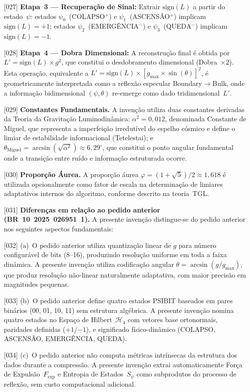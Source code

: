\documentclass[12pt,a4paper]{article}
\newcommand{\alphaii}{\alpha^2}
\newcommand{\thetaM}{\theta_{\text{Miguel}}}
\newcommand{\Fexp}{F_{\text{exp}}}
\newcommand{\Hfour}{\mathcal{H}_4}
\begin{document}
{[027]} \textbf{Etapa~3 --- Recuperação de Sinal:} Extrair
$\text{sign}(L)$ a partir do estado~$\psi$: estados
$\psi_0$~(COLAPSO$^+$) e $\psi_1$~(ASCENSÃO$^+$) implicam
$\text{sign}(L) = +1$; estados $\psi_2$~(EMERGÊNCIA$^-$) e
$\psi_3$~(QUEDA$^-$) implicam $\text{sign}(L) = -1$.

{[028]} \textbf{Etapa~4 --- Dobra Dimensional:} A reconstrução
final é obtida por $L' = \text{sign}(L) \times g^2$, que
constitui o desdobramento dimensional (Dobra~$\times 2$). Esta
operação, equivalente a
$L' = \text{sign}(L) \times [g_{\max} \times \sin(\theta)]^2$,
é geometricamente interpretada como a reflexão especular
Boundary$\to$Bulk, onde a informação bidimensional
$(\psi, \theta)$ re-emerge como dado tridimensional~$L'$.

{[029]} \textbf{Constantes Fundamentais.} A invenção utiliza
duas constantes derivadas da Teoria da Gravitação
Luminodinâmica: $\alphaii = 0{,}012$, denominada Constante de
Miguel, que representa a imperfeição irredutível do espelho
cósmico e define o limiar de estabilidade informacional
(Tetelestai); e
$\thetaM = \arcsin(\sqrt{\alphaii}) \approx 6{,}29^\circ$, que
constitui o ponto angular fundamental onde a transição entre
ruído e informação estruturada ocorre.

{[030]} \textbf{Proporção Áurea.} A proporção áurea
$\varphi = (1 + \sqrt{5})/2 \approx 1{,}618$ é utilizada
opcionalmente como fator de escala na determinação de limiares
adaptativos internos do algoritmo, conforme descrito na
teoria~TGL.

{[031]} \textbf{Diferenças em relação ao pedido anterior
(BR~10~2025~026951~1).} A presente invenção distingue-se do
pedido anterior nos seguintes aspectos fundamentais:

{[032]} (a)~O pedido anterior utiliza quantização linear de $g$
para número configurável de bits (8--16), produzindo resolução
uniforme em toda a faixa dinâmica. A presente invenção utiliza
codificação angular $\theta = \arcsin(g/g_{\max})$, que produz
resolução não-linear naturalmente adaptativa, com maior
precisão em magnitudes pequenas.

{[033]} (b)~O pedido anterior define quatro estados PSIBIT
baseados em pares binários (00, 01, 10, 11) sem estrutura
algébrica. A presente invenção nomina quatro estados no Espaço
de Hilbert~$\Hfour$ com vetores base ortonormais, paridades
definidas ($+1$/$-1$), e significado físico-dinâmico (COLAPSO,
ASCENSÃO, EMERGÊNCIA, QUEDA).

{[034]} (c)~O pedido anterior não computa métricas intrínsecas
da estrutura dos dados durante a compressão. A presente invenção
extrai automaticamente Força de Expulsão~$\Fexp$ e Entropia de
Estados~$S_\psi$ como subprodutos do processo de reflexão, sem
custo computacional adicional.
\end{document}
